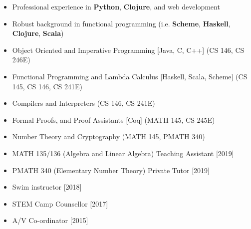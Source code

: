 
\begin{itemize}
    \item Professional experience in \textbf{Python}, \textbf{Clojure}, and web 
        development
    \item Robust background in functional programming (i.e. \textbf{Scheme}, 
        \textbf{Haskell}, \textbf{Clojure}, \textbf{Scala})
\end{itemize}

\smallskip

\begin{itemize}
    \item Object Oriented and Imperative Programming [Java, C, C++] (CS 146, CS 246E)
    \item Functional Programming and Lambda Calculus [Haskell, Scala, Scheme] 
        (CS 145, CS 146, CS 241E)
    \item Compilers and Interpreters (CS 146, CS 241E)
    \item Formal Proofs, and Proof Assistants [Coq] (MATH 145, CS 245E)
    \item Number Theory and Cryptography (MATH 145, PMATH 340)
\end{itemize}
\smallskip

\renewcommand{\labelitemi}{$\textperiodcentered$}
\begin{itemize}
    \item MATH 135/136 (Algebra and Linear Algebra) Teaching Assistant [2019]
    \item PMATH 340 (Elementary Number Theory) Private Tutor [2019]
    \item Swim instructor [2018]
    \item STEM Camp Counsellor [2017]
    \item A/V Co-ordinator [2015]
\end{itemize}

\smallskip



